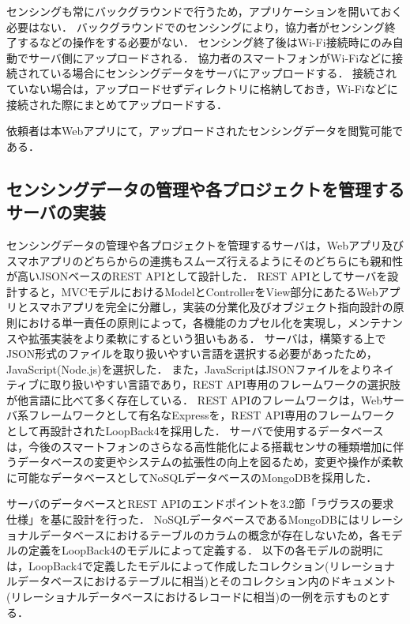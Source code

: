 センシングも常にバックグラウンドで行うため，アプリケーションを開いておく必要はない．
バックグラウンドでのセンシングにより，協力者がセンシング終了するなどの操作をする必要がない．
センシング終了後はWi-Fi接続時にのみ自動でサーバ側にアップロードされる．
協力者のスマートフォンがWi-Fiなどに接続されている場合にセンシングデータをサーバにアップロードする．
接続されていない場合は，アップロードせずディレクトリに格納しておき，Wi-Fiなどに接続された際にまとめてアップロードする．

依頼者は本Webアプリにて，アップロードされたセンシングデータを閲覧可能である．

\subsection{センシングデータの管理や各プロジェクトを管理するサーバの実装}

センシングデータの管理や各プロジェクトを管理するサーバは，Webアプリ及びスマホアプリのどちらからの連携もスムーズ行えるようにそのどちらにも親和性が高いJSONベースのREST APIとして設計した．
REST APIとしてサーバを設計すると，MVCモデルにおけるModelとControllerをView部分にあたるWebアプリとスマホアプリを完全に分離し，実装の分業化及びオブジェクト指向設計の原則における単一責任の原則によって，各機能のカプセル化を実現し，メンテナンスや拡張実装をより柔軟にするという狙いもある．
サーバは，構築する上でJSON形式のファイルを取り扱いやすい言語を選択する必要があったため，JavaScript(Node.js)を選択した．
また，JavaScriptはJSONファイルをよりネイティブに取り扱いやすい言語であり，REST API専用のフレームワークの選択肢が他言語に比べて多く存在している．
REST APIのフレームワークは，Webサーバ系フレームワークとして有名なExpressを，REST API専用のフレームワークとして再設計されたLoopBack4を採用した．
サーバで使用するデータベースは，今後のスマートフォンのさらなる高性能化による搭載センサの種類増加に伴うデータベースの変更やシステムの拡張性の向上を図るため，変更や操作が柔軟に可能なデータベースとしてNoSQLデータベースのMongoDBを採用した．

サーバのデータベースとREST APIのエンドポイントを3.2節「ラヴラスの要求仕様」を基に設計を行った．
NoSQLデータベースであるMongoDBにはリレーショナルデータベースにおけるテーブルのカラムの概念が存在しないため，各モデルの定義をLoopBack4のモデルによって定義する．
以下の各モデルの説明には，LoopBack4で定義したモデルによって作成したコレクション(リレーショナルデータベースにおけるテーブルに相当)とそのコレクション内のドキュメント(リレーショナルデータベースにおけるレコードに相当)の一例を示すものとする．

